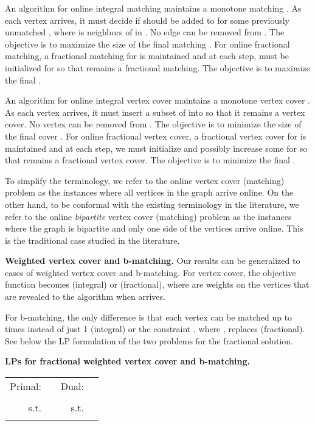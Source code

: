 \documentclass{article}
\begin{document}
An algorithm for online integral matching maintains a monotone matching . As each vertex  arrives, it must decide if  should be added to  for some previously unmatched , where  is neighbors of  in . No edge can be removed from . The objective is to maximize the size of the final matching . For online fractional matching, a fractional matching  for  is maintained and at each step,  must be initialized for  so that  remains a fractional matching. The objective is to maximize the final .

An algorithm for online integral vertex cover maintains a monotone vertex cover . As each vertex  arrives, it must insert a subset of  into  so that it remains a vertex cover. No vertex can be removed from . The objective is to minimize the size of the final cover . For online fractional vertex cover, a fractional vertex cover  for  is maintained and at each step, we must initialize  and possibly increase some  for  so that  remains a fractional vertex cover. The objective is to minimize the final .

To simplify the terminology, we refer to the online vertex cover (matching) problem as the instances where all vertices in the graph arrive online. On the other hand, to be conformal with the existing terminology in the literature, we refer to the online {\em bipartite} vertex cover (matching) problem as the instances where the graph is bipartite and only one side of the vertices arrive online. This is the traditional case studied in the literature.





{\bf Weighted vertex cover and b-matching.} Our results can be generalized to cases of weighted vertex cover and b-matching.
For vertex cover, the objective function becomes  (integral) or  (fractional), where  are weights on the vertices that are revealed to the algorithm when  arrives.

For b-matching, the only difference is that each vertex can be matched up to  times instead of just 1 (integral) or the constraint , where , replaces  (fractional). See below the LP formulation of the two problems for the fractional solution. 

{\bf LPs for fractional weighted vertex cover and b-matching.}

\begin{center}
\begin{tabular}{ | r l | r l | }
\hline
Primal: & & Dual: &\\
 &  &  &  \\
s.t. &  & s.t. &  \\
&   & &  \\
\hline
\end{tabular}
\end{center}
\end{document}
